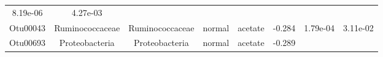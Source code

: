 \documentclass[11pt,]{article}
\begin{document}
\begin{longtable}[]{@{}cccccccc@{}}
\begin{minipage}[t]{0.08\columnwidth}
8.19e-06\strut
\end{minipage} & \begin{minipage}[t]{0.08\columnwidth}\centering\strut
4.27e-03\strut
\end{minipage}\tabularnewline
\begin{minipage}[t]{0.08\columnwidth}\centering\strut
Otu00043\strut
\end{minipage} & \begin{minipage}[t]{0.15\columnwidth}\centering\strut
Ruminococcaceae\strut
\end{minipage} & \begin{minipage}[t]{0.15\columnwidth}\centering\strut
Ruminococcaceae\strut
\end{minipage} & \begin{minipage}[t]{0.08\columnwidth}\centering\strut
normal\strut
\end{minipage} & \begin{minipage}[t]{0.09\columnwidth}\centering\strut
acetate\strut
\end{minipage} & \begin{minipage}[t]{0.07\columnwidth}\centering\strut
-0.284\strut
\end{minipage} & \begin{minipage}[t]{0.08\columnwidth}\centering\strut
1.79e-04\strut
\end{minipage} & \begin{minipage}[t]{0.08\columnwidth}\centering\strut
3.11e-02\strut
\end{minipage}\tabularnewline
\begin{minipage}[t]{0.08\columnwidth}\centering\strut
Otu00693\strut
\end{minipage} & \begin{minipage}[t]{0.15\columnwidth}\centering\strut
Proteobacteria\strut
\end{minipage} & \begin{minipage}[t]{0.15\columnwidth}\centering\strut
Proteobacteria\strut
\end{minipage} & \begin{minipage}[t]{0.08\columnwidth}\centering\strut
normal\strut
\end{minipage} & \begin{minipage}[t]{0.09\columnwidth}\centering\strut
acetate\strut
\end{minipage} & \begin{minipage}[t]{0.07\columnwidth}\centering\strut
-0.289\strut
\end{minipage} & \begin{minipage}[t]{0.08\columnwidth}\centering\strut

\end{minipage}
\end{longtable}
\end{document}
